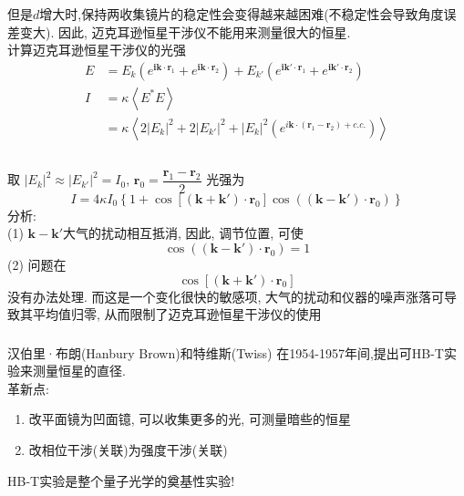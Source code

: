 \begin{frame} 
 \frametitle{}
 但是$d$增大时,保持两收集镜片的稳定性会变得越来越困难(不稳定性会导致角度误差变大). 因此, 迈克耳逊恒星干涉仪不能用来测量很大的恒星. \\ {\vspace*{2.3em}}
 计算迈克耳逊恒星干涉仪的光强
 \[ \begin{aligned}
     E&= E_k (e^{\mathbf{ik}\cdot \mathbf{r}_1}+ e^{\mathbf{ik}\cdot \mathbf{r}_2}) + E_{k'} (e^{\mathbf{ik'}\cdot \mathbf{r}_1}+ e^{\mathbf{ik'}\cdot \mathbf{r}_2}) \\ 
     I&= \kappa \left\langle E^* E \right\rangle \\
     &= \kappa \left\langle 2 \left| E_k\right|^2 + 2\left| E_{k'}\right|^2 + \left|E_k\right|^2 (e ^{i \mathbf{k}\cdot(\mathbf{r}_1-\mathbf{r}_2)+c.c.})  \right\rangle \\
 \end{aligned}\]
\end{frame}

\begin{frame} 
\frametitle{}
 取 $\left| E_{k}\right|^2 \approx \left| E_{k'}\right|^2 = I_0$, $\mathbf{r}_0 = \dfrac{\mathbf{r}_1 - \mathbf{r}_2}{2}$    
 光强为
 \[ I = 4 \kappa I_0 \left\{ 1+\cos\left[ (\mathbf{k} + \mathbf{k}')\cdot \mathbf{r}_0\right] \cos\left( (\mathbf{k} - \mathbf{k}')\cdot \mathbf{r}_0 \right)  \right\}\]
分析: \\ 
 (1) $\mathbf{k} - \mathbf{k}'$大气的扰动相互抵消, 因此, 调节位置, 可使 \[\cos\left( (\mathbf{k} - \mathbf{k}')\cdot \mathbf{r}_0 \right)=1 \]
(2) 问题在
\[ \cos\left[ (\mathbf{k} + \mathbf{k}') \cdot \mathbf{r}_0 \right] \]
没有办法处理. 而这是一个变化很快的敏感项, 大气的扰动和仪器的噪声涨落可导致其平均值归零, 从而限制了迈克耳逊恒星干涉仪的使用 
\end{frame}

\begin{frame} 
\frametitle{}
 汉伯里·布朗(Hanbury Brown)和特维斯(Twiss) 在1954-1957年间,提出可HB-T实验来测量恒星的直径. \\
 革新点:
 \begin{enumerate}
     \item 改平面镜为凹面镱, 可以收集更多的光, 可测量暗些的恒星
     \item 改相位干涉(关联)为强度干涉(关联)
 \end{enumerate}
 HB-T实验是整个量子光学的奠基性实验!
\end{frame}

